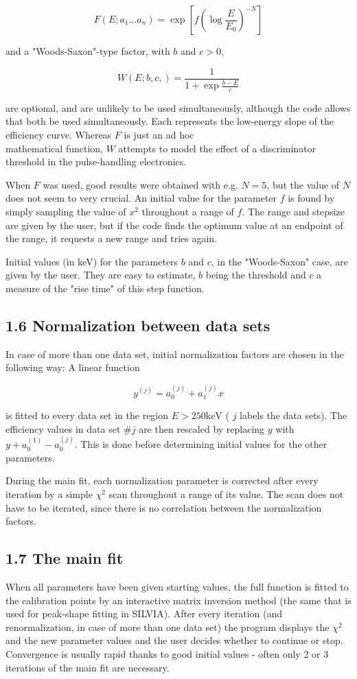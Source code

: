 \documentclass[10pt]{article}
\begin{document}
$$
F\left(E ; a_{1} \ldots a_{n}\right)=\exp \left[f\left(\log \frac{E}{E_{0}}\right)^{-N}\right]
$$

and a "Woods-Saxon"-type factor, with $b$ and $c>0$,

$$
W(E ; b, c,)=\frac{1}{1+\exp \frac{b-E}{c}}
$$

are optional, and are unlikely to be used simultaneously, although the code allows that both be used simultaneously. Each represents the low-energy slope of the efficiency curve. Whereas $F$ is just an ad hoc\\
mathematical function, $W$ attempts to model the effect of a discriminator threshold in the pulse-handling electronics.

When $F$ was used, good results were obtained with e.g. $N=5$, but the value of $N$ does not seem to very crucial. An initial value for the parameter $f$ is found by simply sampling the value of $x^{2}$ throughout a range of $f$. The range and stepsize are given by the user, but if the code finds the optimum value at an endpoint of the range, it requests a new range and tries again.

Initial values (in keV) for the parameters $b$ and $c$, in the "Woods-Saxon" case, are given by the user. They are easy to estimate, $b$ being the threshold and $c$ a measure of the "rise time" of this step function.

\subsection*{1.6 Normalization between data sets}
In case of more than one data set, initial normalization factors are chosen in the following way: A linear function

$$
y^{(j)}=a_{0}^{(j)}+a_{1}^{(j)} x
$$

is fitted to every data set in the region $E>250 \mathrm{keV}$ ( $j$ labels the data sets). The efficiency values in data set $\# j$ are then rescaled by replacing $y$ with $y+a_{0}^{(1)}-a_{0}^{(j)}$. This is done before determining initial values for the other parameters.

During the main fit, each normalization parameter is corrected after every iteration by a simple $\chi^{2}$ scan throughout a range of its value. The scan does not have to be iterated, since there is no correlation between the normalization factors.

\subsection*{1.7 The main fit}
When all parameters have been given starting values, the full function is fitted to the calibration points by an interactive matrix inversion method (the same that is used for peak-shape fitting in SILVIA). After every iteration (and renormalization, in case of more than one data set) the program displays the $\chi^{2}$ and the new parameter values and the user decides whether to continue or stop. Convergence is usually rapid thanks to good initial values - often only 2 or 3 iterations of the main fit are necessary.
\end{document}
